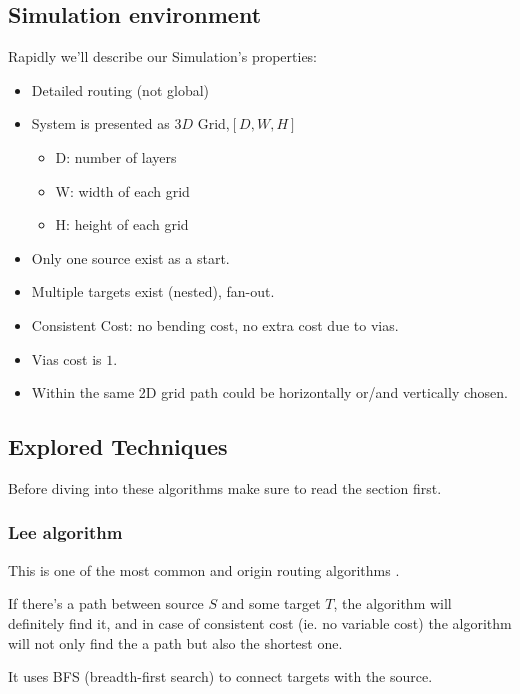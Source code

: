 \subsection{Simulation environment}
    Rapidly we'll describe our Simulation's properties:
    \begin{itemize}
        \item Detailed routing (not global)
        \item System is presented as $3D$ Grid,$[D, W, H]$
        \begin{itemize}
            \item D: number of layers 
            \item W: width of each grid
            \item H: height of each grid
        \end{itemize}
        \item Only one source exist as a start.
        \item Multiple targets exist (nested), fan-out.          
        \item Consistent Cost: no bending cost, no extra cost due to vias.
        \item Vias cost is $1$.
        \item Within the same 2D grid path could be horizontally or/and vertically
            chosen.
    \end{itemize}

\subsection{Explored Techniques}
    Before diving into these algorithms make sure to read the  section first.
    \newline

    \subsubsection{Lee algorithm}
    \label{LeeSection}
    This is one of the most common and origin routing algorithms \cite{LeeRef}.

    If there's a path between source $S$ and some target $T$, the algorithm will definitely find it,
    and in case of consistent cost (ie. no variable cost) the algorithm will not only find the 
    a path but also the shortest one.

    It uses BFS (breadth-first search) to connect targets with the source.

